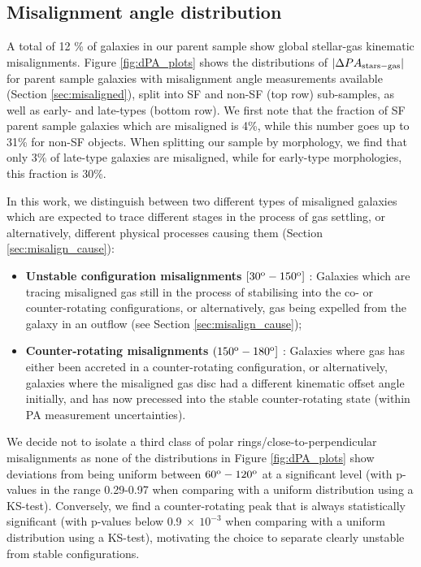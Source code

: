 \documentclass[fleqn,usenatbib]{mnras}
\begin{document}
\subsection{Misalignment angle distribution}
\label{sec:dpa_distribution}

A total of 12 \% of galaxies in our parent sample show global stellar-gas kinematic misalignments. %
Figure \ref{fig:dPA_plots} shows the distributions of $|\Delta PA_{\rm{stars-gas}}|$ for parent sample galaxies with misalignment angle measurements available (Section \ref{sec:misaligned}), split into SF and non-SF (top row) sub-samples, as well as early- and late-types (bottom row). We first note that the fraction of SF parent sample galaxies which are misaligned is 4\%, while this number goes up to 31\% for non-SF objects. When splitting our sample by morphology, we find that only 3\% of late-type galaxies are misaligned, while for early-type morphologies, this fraction is 30\%. 

In this work, we distinguish between two different types of misaligned galaxies which are expected to trace different stages in the process of gas settling, or alternatively, different physical processes causing them (Section \ref{sec:misalign_cause}):

\begin{itemize}
    \item \textbf{Unstable configuration misalignments} $[30^{\rm{o}}-150^{\rm{o}}]$ : Galaxies which are tracing misaligned gas still in the process of stabilising into the co- or counter-rotating configurations, or alternatively, gas being expelled from the galaxy in an outflow (see Section \ref{sec:misalign_cause});
    \item \textbf{Counter-rotating misalignments} $(150^{\rm{o}}-180^{\rm{o}}]$ : Galaxies where gas has either been accreted in a counter-rotating configuration, or alternatively, galaxies where the misaligned gas disc had a different kinematic offset angle initially, and has now precessed into the stable counter-rotating state (within PA measurement uncertainties). 
\end{itemize}

We decide not to isolate a third class of polar rings/close-to-perpendicular misalignments as none of the distributions in Figure \ref{fig:dPA_plots} show deviations from being uniform between $60^{\rm{o}}-120^{\rm{o}}$ at a significant level (with p-values in the range 0.29-0.97 when comparing with a uniform distribution using a KS-test). Conversely, we find a counter-rotating peak that is always statistically significant (with p-values below 0.9$\ \times\ 10^{-3}$ when comparing with a uniform distribution using a KS-test), motivating the choice to separate clearly unstable from stable configurations. 
\end{document}

